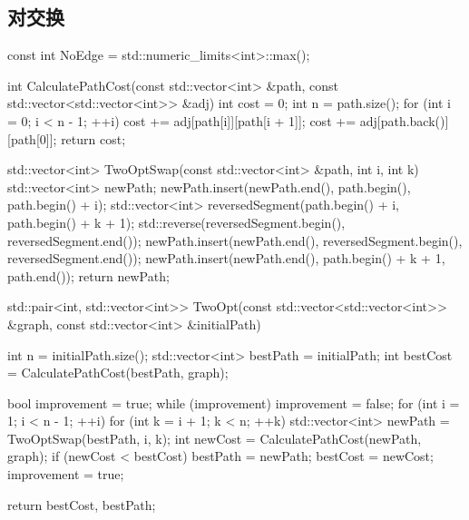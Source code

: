 \subsection{对交换}

\begin{cppcode}
const int NoEdge = std::numeric_limits<int>::max();

int CalculatePathCost(const std::vector<int> &path, const std::vector<std::vector<int>> &adj) {
    int cost = 0;
    int n = path.size();
    for (int i = 0; i < n - 1; ++i) {
        cost += adj[path[i]][path[i + 1]];
    }
    cost += adj[path.back()][path[0]];
    return cost;
}

std::vector<int> TwoOptSwap(const std::vector<int> &path, int i, int k) {
    std::vector<int> newPath;
    newPath.insert(newPath.end(), path.begin(), path.begin() + i);
    std::vector<int> reversedSegment(path.begin() + i, path.begin() + k + 1);
    std::reverse(reversedSegment.begin(), reversedSegment.end());
    newPath.insert(newPath.end(), reversedSegment.begin(), reversedSegment.end());
    newPath.insert(newPath.end(), path.begin() + k + 1, path.end());
    return newPath;
}

std::pair<int, std::vector<int>> TwoOpt(const std::vector<std::vector<int>> &graph, const std::vector<int> &initialPath) {
    int n = initialPath.size();
    std::vector<int> bestPath = initialPath;
    int bestCost = CalculatePathCost(bestPath, graph);

    bool improvement = true;
    while (improvement) {
        improvement = false;
        for (int i = 1; i < n - 1; ++i) {
            for (int k = i + 1; k < n; ++k) {
                std::vector<int> newPath = TwoOptSwap(bestPath, i, k);
                int newCost = CalculatePathCost(newPath, graph);
                if (newCost < bestCost) {
                    bestPath = newPath;
                    bestCost = newCost;
                    improvement = true;
                }
            }
        }
    }

    return {bestCost, bestPath};
}
\end{cppcode}

